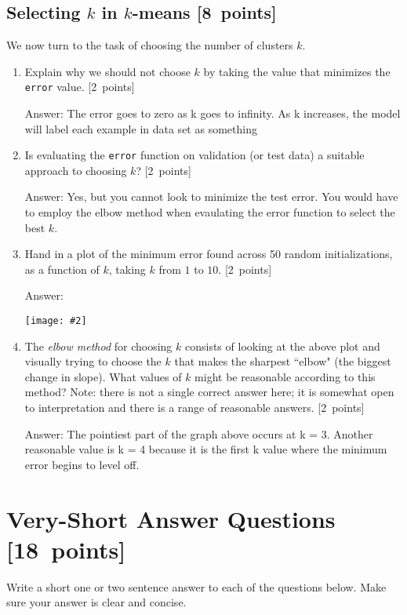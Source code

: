 \documentclass{article}
\newcommand{\blu}[1]{{\textcolor{blu}{#1}}}
\newcommand{\gre}[1]{\textcolor{gre}{#1}}
\newcommand\ans[1]{\par\gre{Answer: #1}}
\let\ask\blu
\newcommand\pts[1]{\textcolor{pointscolour}{[#1~points]}}
\newcommand{\centerfig}[2]{\begin{center}\texttt{[image: \#2]}\end{center}}
\begin{document}
    \clearpage
    \subsection{Selecting $k$ in $k$-means \pts{8}}

    We now turn to the task of choosing the number of clusters $k$.

    \begin{enumerate}
        \item \ask{Explain why we should not choose $k$ by taking the value that minimizes the \texttt{error} value.} \pts{2}
        \ans{The error goes to zero as k goes to infinity. As k increases, the model will label each example in data set as something}
        \item \ask{Is evaluating the \texttt{error} function on validation (or test data) a suitable approach to choosing $k$?} \pts{2}
        
        \ans{Yes, but you cannot look to minimize the test error. You would have to employ the elbow method when evaulating the error function to select the best $k$.}
        
        \item \ask{Hand in a plot of the minimum error found across 50 random initializations, as a function of $k$, taking $k$ from $1$ to $10$.} \pts{2}
        \ans{}
        \centerfig{.7}{figs/kmeans minimum error vs k.png}
        \item The \emph{elbow method} for choosing $k$ consists of looking at the above plot and visually trying to choose the $k$ that makes the sharpest ``elbow" (the biggest change in slope). \ask{What values of $k$ might be reasonable according to this method?} Note: there is not a single correct answer here; it is somewhat open to interpretation and there is a range of reasonable answers. \pts{2}
        
        \ans{The pointiest part of the graph above occurs at k = 3. Another reasonable value is k = 4 because it is the first k value where the minimum error begins to level off.}
    \end{enumerate}

    \clearpage
    \section{Very-Short Answer Questions \pts{18}}

    \ask{Write a short one or two sentence answer to each of the questions below}. Make sure your answer is clear and concise.
\end{document}
